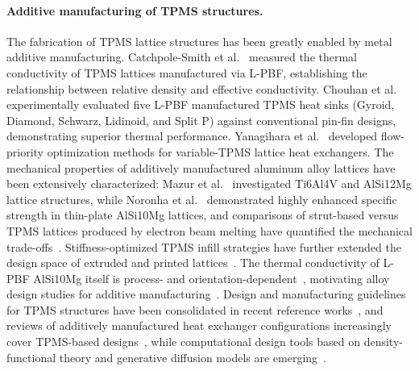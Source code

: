 \paragraph{Additive manufacturing of TPMS structures.}
The fabrication of TPMS lattice structures has been greatly enabled by metal additive manufacturing. Catchpole-Smith et al.~\cite{catchpole2019thermal} measured the thermal conductivity of TPMS lattices manufactured via L-PBF, establishing the relationship between relative density and effective conductivity. Chouhan et al.~\cite{chouhan2025heat} experimentally evaluated five L-PBF manufactured TPMS heat sinks (Gyroid, Diamond, Schwarz, Lidinoid, and Split P) against conventional pin-fin designs, demonstrating superior thermal performance. Yanagihara et al.~\cite{yanagihara2026flow} developed flow-priority optimization methods for variable-TPMS lattice heat exchangers. The mechanical properties of additively manufactured aluminum alloy lattices have been extensively characterized: Mazur et al.~\cite{mazur2017mechanical} investigated Ti6Al4V and AlSi12Mg lattice structures, while Noronha et al.~\cite{noronha2025thin} demonstrated highly enhanced specific strength in thin-plate AlSi10Mg lattices, and comparisons of strut-based versus TPMS lattices produced by electron beam melting have quantified the mechanical trade-offs~\cite{sokollu2022mechanical,platek2020investigations}. Stiffness-optimized TPMS infill strategies have further extended the design space of extruded and printed lattices~\cite{wegner2026stiffness}. The thermal conductivity of L-PBF AlSi10Mg itself is process- and orientation-dependent~\cite{elkholy2022characterization,azizi2023process,liu2021inhomogeneous}, motivating alloy design studies for additive manufacturing~\cite{gong2023aluminum,teodorescu2025investigation}. Design and manufacturing guidelines for TPMS structures have been consolidated in recent reference works~\cite{traub2026design}, and reviews of additively manufactured heat exchanger configurations increasingly cover TPMS-based designs~\cite{choudhari2025additive}, while computational design tools based on density-functional theory and generative diffusion models are emerging~\cite{yin2025density,yan2026fourier}.

